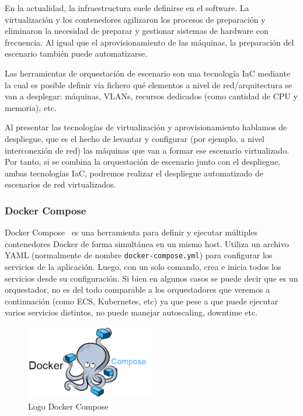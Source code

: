 En la actualidad, la infraestructura suele definirse en el software. La virtualización y los contenedores agilizaron los procesos de preparación y eliminaron la necesidad de preparar y gestionar sistemas de hardware con frecuencia. Al igual que el aprovisionamiento de las máquinas, la preparación del escenario también puede automatizarse.

Las herramientas de orquestación de escenario son una tecnología IaC mediante la cual es posible definir vía fichero qué elementos a nivel de red/arquitectura se van a desplegar: máquinas, VLANs, recursos dedicados (como cantidad de CPU y memoria), etc. 

Al presentar las tecnologías de virtualización y aprovisionamiento hablamos de despliegue, que es el hecho de levantar y configurar (por ejemplo, a nivel interconexión de red) las máquinas que van a formar ese escenario virtualizado. Por tanto, si se combina la orquestación de escenario junto con el despliegue, ambas tecnologías IaC, podremos realizar el despliegue automatizado de escenarios de red virtualizados.

\subsubsection{Docker Compose}
	Docker Compose~\cite{orq2} es una herramienta para definir y ejecutar múltiples contenedores Docker de forma simultánea en un mismo host. Utiliza un archivo YAML (normalmente de nombre \texttt{docker-compose.yml}) para configurar los servicios de la aplicación. Luego, con un solo comando, crea e inicia todos los servicios desde su configuración. Si bien en algunos casos se puede decir que es un orquestador, no es del todo comparable a los orquestadores que veremos a continuación (como ECS, Kubernetes, etc) ya que pese a que puede ejecutar varios servicios distintos, no puede manejar autoscaling, downtime etc.

	\begin{figure}[h]
	\centering
	\includegraphics[width=0.5\textwidth]{../imgs/EdA/compose.png}
	\caption{Logo Docker Compose}
	\label{fig:compose}
	\end{figure}

